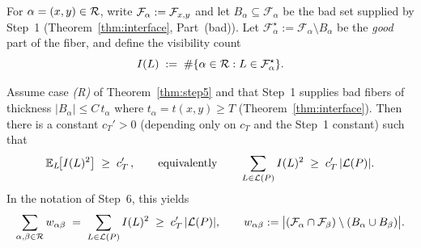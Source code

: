 For $\alpha = (x,y) \in \mathcal{R}$, write $\mathcal{F}_\alpha := \mathcal{F}_{x,y}$ and let
$B_\alpha \subseteq \mathcal{F}_\alpha$ be the bad set supplied by Step~1
(Theorem~\ref{thm:interface}, Part~(bad)). Let
$\mathcal{F}_\alpha^\star := \mathcal{F}_\alpha \setminus B_\alpha$ be the
\emph{good} part of the fiber, and define the visibility count
\[
I(L) \;:=\; \#\{\alpha \in \mathcal{R} : L \in \mathcal{F}_\alpha^\star\}.
\]

\begin{corollary}\label{cor:second-moment}
Assume case \emph{(R)} of Theorem~\ref{thm:step5} and that Step~1 supplies bad
fibers of thickness $|B_\alpha| \le C\,t_\alpha$ where $t_\alpha = t(x,y) \ge T$
(Theorem~\ref{thm:interface}). Then there is a constant $c_T' > 0$ (depending only
on $c_T$ and the Step~1 constant) such that
\[
\mathbb{E}_L\!\big[I(L)^2\big] \;\ge\; c_T'\,,
\qquad\text{equivalently}\qquad
\sum_{L \in \mathcal{L}(P)} I(L)^2 \;\ge\; c_T'\,|\mathcal{L}(P)|.
\]
In the notation of Step~6, this yields
\[
\sum_{\alpha,\beta \in \mathcal{R}} w_{\alpha\beta}
\;=\; \sum_{L \in \mathcal{L}(P)} I(L)^2 \;\ge\; c_T'\,|\mathcal{L}(P)|,
\qquad w_{\alpha\beta} := \big|(\mathcal{F}_\alpha \cap \mathcal{F}_\beta) \setminus (B_\alpha \cup B_\beta)\big|.
\]
\end{corollary}

